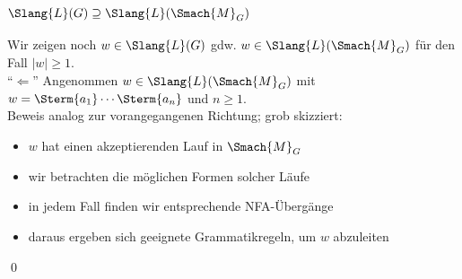\documentclass[aspectratio=1610,onlymath]{beamer}
\begin{document}
\begin{frame}[t]\frametitle{$\Slang{L}(G)\supseteq\Slang{L}(\Smach{M}_G)$}

Wir zeigen noch $w\in\Slang{L}(G)$ gdw. $w\in\Slang{L}(\Smach{M}_G)$ für den Fall $|w|\geq 1$.\\[1ex]

"`$\Leftarrow$"' Angenommen $w\in\Slang{L}(\Smach{M}_G)$ mit $w=\Sterm{a_1}\cdots\Sterm{a_n}$ und $n\geq 1$.\pause\\[2ex]

Beweis analog zur vorangegangenen Richtung; grob skizziert:
\begin{itemize}
\item $w$ hat einen akzeptierenden Lauf in $\Smach{M}_G$
\item wir betrachten die möglichen Formen solcher Läufe
\item in jedem Fall finden wir entsprechende NFA-Übergänge
\item daraus ergeben sich geeignete Grammatikregeln, um $w$ abzuleiten
\end{itemize}

\qed

\end{frame}
\end{document}
